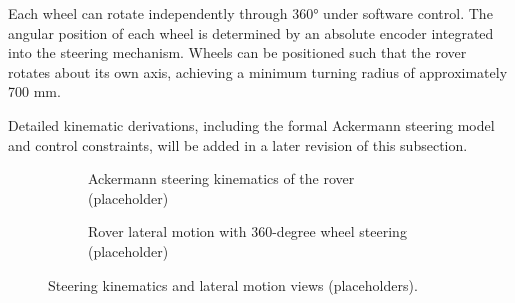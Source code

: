 

Each wheel can rotate independently through 360° under software control. The angular position of each wheel is determined by an absolute encoder integrated into the steering mechanism. Wheels can be positioned such that the rover rotates about its own axis, achieving a minimum turning radius of approximately 700 mm.

Detailed kinematic derivations, including the formal Ackermann steering model and control constraints, will be added in a later revision of this subsection.

\begin{figure}[htbp]
	\centering
	\begin{subfigure}[t]{0.49\linewidth}
		\centering
		\caption{Ackermann steering kinematics of the rover (placeholder)}
		\label{fig:rover_ackermann_kinematics_placeholder}
	\end{subfigure}\hfill
	\begin{subfigure}[t]{0.49\linewidth}
		\centering
		\caption{Rover lateral motion with 360-degree wheel steering (placeholder)}
		\label{fig:rover_crab_motion_placeholder}
	\end{subfigure}
	\caption{Steering kinematics and lateral motion views (placeholders).}
	\label{fig:rover_steering_motion_placeholders}
\end{figure}

